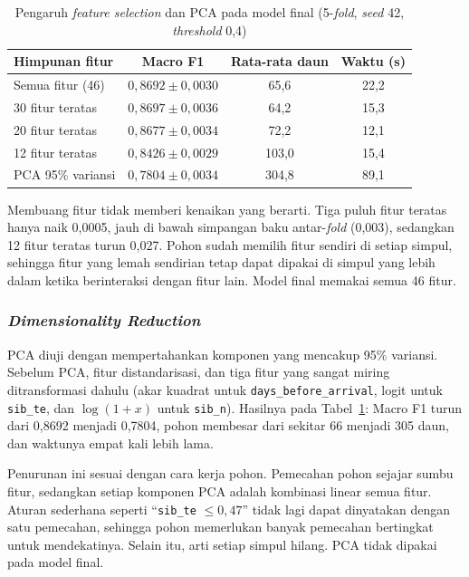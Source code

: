 \begin{table}[H]
	\centering
	\caption{Pengaruh \textit{feature selection} dan PCA pada model final (5-\textit{fold}, \textit{seed} 42, \textit{threshold} 0,4)}
	\label{tab:dtl-fs}
	\begin{tabular}{l c c c}
		\toprule
		\textbf{Himpunan fitur} & \textbf{Macro F1} & \textbf{Rata-rata daun} & \textbf{Waktu (s)} \\
		\midrule
		Semua fitur (46) & $0{,}8692 \pm 0{,}0030$ & 65,6 & 22,2 \\
		30 fitur teratas & $0{,}8697 \pm 0{,}0036$ & 64,2 & 15,3 \\
		20 fitur teratas & $0{,}8677 \pm 0{,}0034$ & 72,2 & 12,1 \\
		12 fitur teratas & $0{,}8426 \pm 0{,}0029$ & 103,0 & 15,4 \\
		PCA 95\% variansi & $0{,}7804 \pm 0{,}0034$ & 304,8 & 89,1 \\
		\bottomrule
	\end{tabular}
\end{table}

Membuang fitur tidak memberi kenaikan yang berarti. Tiga puluh fitur teratas hanya naik 0,0005, jauh
di bawah simpangan baku antar-\textit{fold} (0,003), sedangkan 12 fitur teratas turun 0,027. Pohon
sudah memilih fitur sendiri di setiap simpul, sehingga fitur yang lemah sendirian tetap dapat dipakai
di simpul yang lebih dalam ketika berinteraksi dengan fitur lain. Model final memakai semua 46 fitur.

\subsubsection{\textit{Dimensionality Reduction}}
\label{subsec:dtl-dimred}

PCA diuji dengan mempertahankan komponen yang mencakup 95\% variansi. Sebelum PCA, fitur
distandarisasi, dan tiga fitur yang sangat miring ditransformasi dahulu (akar kuadrat untuk
\texttt{days\_before\_arrival}, logit untuk \texttt{sib\_te}, dan $\log(1+x)$ untuk \texttt{sib\_n}).
Hasilnya pada Tabel~\ref{tab:dtl-fs}: Macro F1 turun dari 0,8692 menjadi 0,7804, pohon membesar dari
sekitar 66 menjadi 305 daun, dan waktunya empat kali lebih lama.

Penurunan ini sesuai dengan cara kerja pohon. Pemecahan pohon sejajar sumbu fitur, sedangkan setiap
komponen PCA adalah kombinasi linear semua fitur. Aturan sederhana seperti ``\texttt{sib\_te}
$\le 0{,}47$'' tidak lagi dapat dinyatakan dengan satu pemecahan, sehingga pohon memerlukan banyak
pemecahan bertingkat untuk mendekatinya. Selain itu, arti setiap simpul hilang. PCA tidak dipakai pada
model final.
